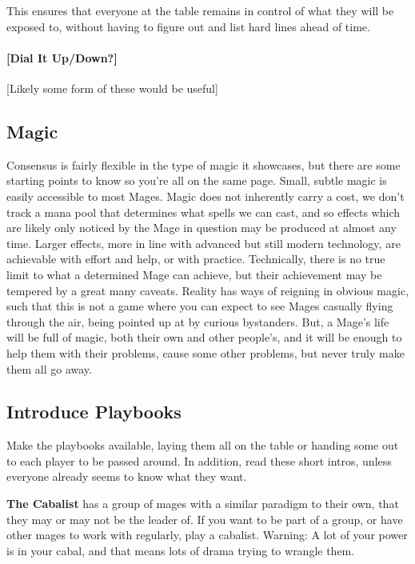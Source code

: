\documentclass[10pt,twoside,openright]{memoir}
\begin{document}
This ensures that everyone at the table remains in control of what they
will be exposed to, without having to figure out and list hard lines
ahead of time.

\hypertarget{dial-it-updown}{%
\paragraph{{[}Dial It Up/Down?{]}}\label{dial-it-updown}}

{[}Likely some form of these would be useful{]}

\hypertarget{magic}{%
\subsection{Magic}\label{magic}}

Consensus is fairly flexible in the type of magic it showcases, but
there are some starting points to know so you're all on the same page.
Small, subtle magic is easily accessible to most Mages. Magic does not
inherently carry a cost, we don't track a mana pool that determines what
spells we can cast, and so effects which are likely only noticed by the
Mage in question may be produced at almost any time. Larger effects,
more in line with advanced but still modern technology, are achievable
with effort and help, or with practice. Technically, there is no true
limit to what a determined Mage can achieve, but their achievement may
be tempered by a great many caveats. Reality has ways of reigning in
obvious magic, such that this is not a game where you can expect to see
Mages casually flying through the air, being pointed up at by curious
bystanders. But, a Mage's life will be full of magic, both their own and
other people's, and it will be enough to help them with their problems,
cause some other problems, but never truly make them all go away.

\hypertarget{introduce-playbooks}{%
\subsection{Introduce Playbooks}\label{introduce-playbooks}}

Make the playbooks available, laying them all on the table or handing
some out to each player to be passed around. In addition, read these
short intros, unless everyone already seems to know what they want.

\textbf{The Cabalist} has a group of mages with a similar paradigm to
their own, that they may or may not be the leader of. If you want to be
part of a group, or have other mages to work with regularly, play a
cabalist. Warning: A lot of your power is in your cabal, and that means
lots of drama trying to wrangle them.
\end{document}
